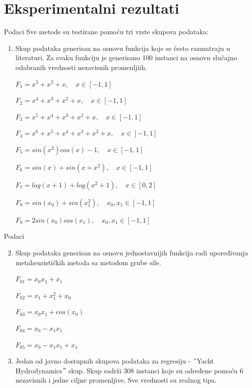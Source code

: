 \documentclass{beamer}
\begin{document}
\section{Eksperimentalni rezultati}

\begin{frame}{Podaci}
Sve metode su testirane pomoću tri vrste skupova podataka:
\begin{enumerate}
\small
    \item Skup podataka generisan na osnovu funkcija koje se često razmatraju u literaturi. Za svaku funkciju je generisano 100 instanci na osnovu slučajno odabranih vrednosti nezavisnih promenljiih. 
    
    $ F_1 = x^3 + x^2 + x, \quad x \in [-1, 1] $

    $ F_2 = x^4 + x^3 + x^2 + x, \quad x \in [-1, 1] $
    
    $ F_3 = x^5 + x^4 + x^3 + x^2 + x, \quad x \in [-1, 1] $
    
    $ F_4 = x^6 + x^5 + x^4 + x^3 + x^2 + x, \quad x \in [-1, 1] $
    
    $ F_5 = sin(x^2)cos(x) - 1, \quad x \in [-1, 1] $
    
    $ F_6 = sin(x) + sin(x + x^2), \quad x \in [-1, 1] $
    
    $ F_7 = log(x + 1) + log(x^2 + 1), \quad x \in [0, 2] $
    
    $ F_8 = sin(x_0) + sin(x_1^2), \quad x_0, x_1 \in [-1, 1] $
    
    $ F_9 = 2sin(x_0)cos(x_1), \quad x_0, x_1 \in [-1, 1] $
\end{enumerate}
\end{frame}

\begin{frame}{Podaci}
\begin{enumerate}
\setcounter{enumi}{1}
    \item Skup podataka generisan na osnovu jednostavnijih funkcija radi upoređivanja metaheurističkih metoda sa metodom grube sile.
    
    $F_{01} = x_0 x_1 + x_1$

    $F_{02} = x_1 + x_1^2 + x_0$
    
    $F_{03} = x_0 x_1 + cos(x_0)$
    
    $F_{04} = x_0 - x_1 x_1$
    
    $F_{05} = x_0 - x_1 x_1 + x_1$
\end{enumerate}
\begin{enumerate}
\setcounter{enumi}{2}
    \item Jedan od javno dostupnih skupova podataka za regresiju - $"$Yacht Hydrodynamics$"$ skup. Skup sadrži 308 instanci koje su određene pomoću 6 nezavisnih i jedne ciljne promenljive. Sve vrednosti su realnog tipa.
\end{enumerate}
\end{frame}
\end{document}
